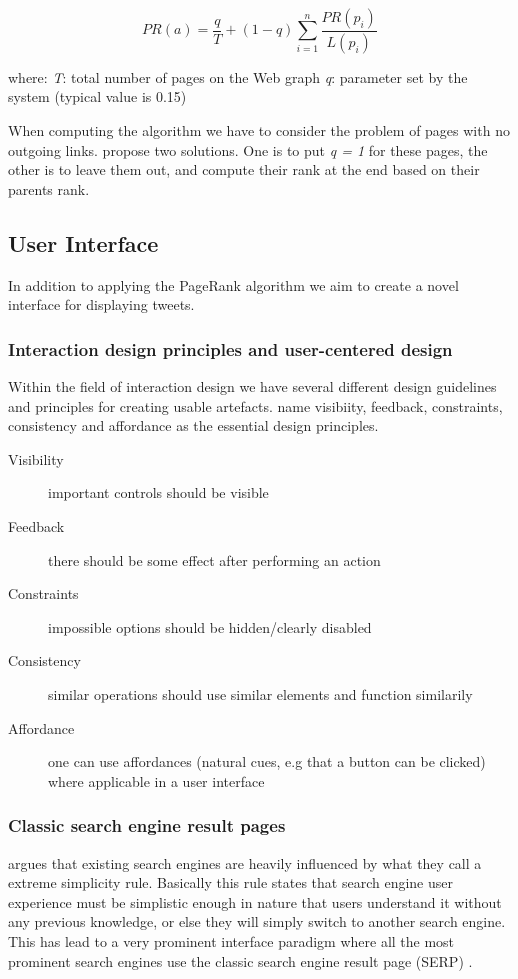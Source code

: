 \begin{displaymath}
PR(a) = \frac{q}{T} + (1 − q) \sum_{i=1}^{n} \frac{PR(p_i)}{L(p_i)}
\end{displaymath}

where:\newline
\emph{T}: total number of pages on the Web graph\newline
\emph{q}: parameter set by the system (typical value is 0.15)

When computing the algorithm we have to consider the problem of pages with no outgoing links. \citet{Baeza-Yates2011} propose two solutions. One is to put \emph{q = 1} for these pages, the other is to leave them out, and compute their rank at the end based on their parents rank. 


\subsection{User Interface}
In addition to applying the PageRank algorithm we aim to create a novel interface for displaying tweets.

\subsubsection{Interaction design principles and user-centered design}
Within the field of interaction design we have several different design guidelines and principles for creating usable artefacts. \citet{Sharp2007} name visibiity, feedback, constraints, consistency and affordance as the essential design principles.

\begin{description}
  \item[Visibility] important controls should be visible
  \item[Feedback] there should be some effect after performing an action
  \item[Constraints] impossible options should be hidden/clearly disabled
  \item[Consistency] similar operations should use similar elements and function similarily
  \item[Affordance] one can use affordances (natural cues, e.g that a button can be clicked) where applicable in a user interface
\end{description}

\subsubsection{Classic search engine result pages}
\citet[p.480]{Baeza-Yates2011} argues that existing search engines are heavily influenced by what they call a extreme simplicity rule. Basically this rule states that search engine user experience must be simplistic enough in nature that users understand it without any previous knowledge, or else they will simply switch to another search engine. This has lead to a very prominent interface paradigm where all the most prominent search engines use the classic search engine result page (SERP) \citep{Baeza-Yates2011}. 

